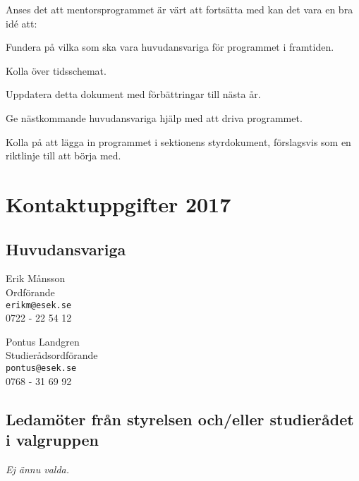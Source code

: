 \documentclass[10pt]{article}
\def\year{2017}
\begin{document}
    Anses det att mentorsprogrammet är värt att fortsätta med kan det vara en bra idé att:
    \begin{dashlist}
        \item Fundera på vilka som ska vara huvudansvariga för programmet i framtiden.
        \item Kolla över tidsschemat.
        \item Uppdatera detta dokument med förbättringar till nästa år.
        \item Ge nästkommande huvudansvariga hjälp med att driva programmet.
        \item Kolla på att lägga in programmet i sektionens styrdokument, förslagsvis som en riktlinje till att börja med.
    \end{dashlist}

    \section{Kontaktuppgifter \year}
    \subsection*{Huvudansvariga}
    Erik Månsson\\
    Ordförande\\
    \texttt{erikm@esek.se}\\
    0722 - 22 54 12

    Pontus Landgren\\
    Studierådsordförande\\
    \texttt{pontus@esek.se}\\
    0768 - 31 69 92

    \subsection*{Ledamöter från styrelsen och/eller studierådet i valgruppen}
    \emph{Ej ännu valda.}
\end{document}
